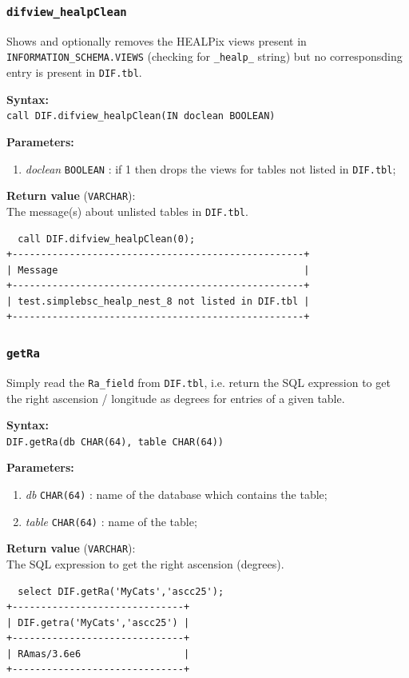 \documentclass[10pt,titlepage]{article}
\newcommand{\syntax}[1]
{
  \bigskip
  \noindent
  \textbf{Syntax:} \\ 
  \indent \texttt{#1}
}
\newenvironment{parameters}
{
  \medskip
  \noindent
  \textbf{Parameters:}
  \begin{enumerate}
}
{
  \end{enumerate}
}
\newcommand{\param}[2]
{
  \item \textit{#1} \texttt{#2} 
}
\newcommand{\return}[1]
{
  \medskip
  \noindent
  \textbf{Return value} (\texttt{#1}): \\
  \indent
}
\newcommand{\example}
{
\medskip
\noindent{\textbf{Example:}}
}
\begin{document}
\subsubsection{{\tt difview\_healpClean}}
Shows and optionally removes the HEALPix views present in {\tt INFORMATION\_SCHEMA.VIEWS}
(checking for {\tt \_healp\_} string) but no corresponsding entry is present in {\tt DIF.tbl}.

\syntax{call DIF.difview\_healpClean(IN doclean BOOLEAN)}

\begin{parameters}
  \param{doclean}{BOOLEAN}: if 1 then drops the views for tables not listed in {\tt DIF.tbl};
\end{parameters}

\return{VARCHAR} The message(s) about unlisted tables in {\tt DIF.tbl}.

\example
%
\begin{verbatim}
  call DIF.difview_healpClean(0);
+---------------------------------------------------+
| Message                                           |
+---------------------------------------------------+
| test.simplebsc_healp_nest_8 not listed in DIF.tbl |
+---------------------------------------------------+
\end{verbatim}
%
%



\subsubsection{{\tt getRa}}
Simply read the \texttt{Ra\_field} from \texttt{DIF.tbl}, i.e. return the
SQL expression to get the right ascension / longitude as degrees for
entries of a given table.

\syntax{DIF.getRa(db CHAR(64), table CHAR(64))}

\begin{parameters}
  \param{db}{CHAR(64)}: name of the database which contains the table;
  \param{table}{CHAR(64)}: name of the table;
\end{parameters}

\return{VARCHAR} The SQL expression to get the right ascension (degrees).

\example
%
\begin{verbatim}
  select DIF.getRa('MyCats','ascc25');
+------------------------------+
| DIF.getra('MyCats','ascc25') |
+------------------------------+
| RAmas/3.6e6                  |
+------------------------------+
\end{verbatim}
%
%
\end{document}

